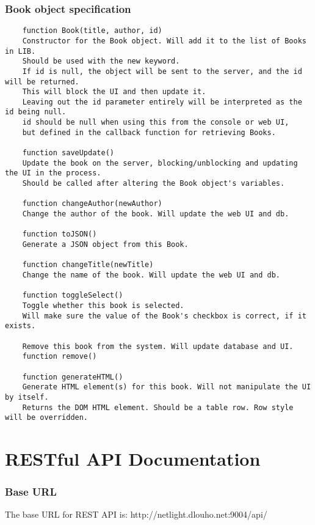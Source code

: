 \subsubsection{Book object specification}
\begin{verbatim}
    function Book(title, author, id)
    Constructor for the Book object. Will add it to the list of Books in LIB. 
    Should be used with the new keyword.
    If id is null, the object will be sent to the server, and the id will be returned. 
    This will block the UI and then update it.
    Leaving out the id parameter entirely will be interpreted as the id being null.
    id should be null when using this from the console or web UI, 
    but defined in the callback function for retrieving Books.
    
    function saveUpdate()
    Update the book on the server, blocking/unblocking and updating the UI in the process.
    Should be called after altering the Book object's variables.
    
    function changeAuthor(newAuthor)
    Change the author of the book. Will update the web UI and db.
    
    function toJSON()
    Generate a JSON object from this Book.

    function changeTitle(newTitle)
    Change the name of the book. Will update the web UI and db.

    function toggleSelect()
    Toggle whether this book is selected. 
    Will make sure the value of the Book's checkbox is correct, if it exists.
    
    Remove this book from the system. Will update database and UI.
    function remove()

    function generateHTML()
    Generate HTML element(s) for this book. Will not manipulate the UI by itself.
    Returns the DOM HTML element. Should be a table row. Row style will be overridden.
\end{verbatim}


\section{RESTful API Documentation}

\subsubsection{Base URL}
The base URL for REST API is: http://netlight.dlouho.net:9004/api/

